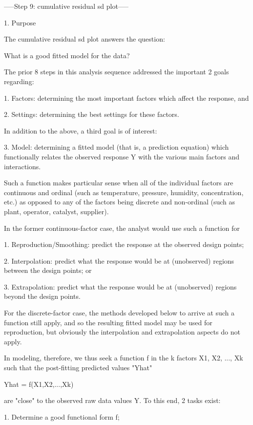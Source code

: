 -----Step 9: cumulative residual sd plot-----

1. Purpose

The cumulative residual sd plot answers the question:

   What is a good fitted model for the data?

The prior 8 steps in this analysis sequence
addressed the important 2 goals regarding:

   1. Factors: determining the most important factors
      which affect the response, and

   2. Settings: determining the best settings for these
      factors.

In addition to the above, a third goal is of
interest:

   3. Model: determining a fitted model (that is, a
      prediction equation) which functionally
      relates the observed response Y with the
      various main factors and interactions.

Such a function makes particular sense when all of the
individual factors are continuous and ordinal (such as
temperature, pressure, humidity, concentration, etc.)
as opposed to any of the factors being discrete and
non-ordinal (such as plant, operator, catalyst,
supplier).

In the former continuous-factor case, the analyst would
use such a function for

   1. Reproduction/Smoothing: predict the response
      at the observed design points;

   2. Interpolation: predict what the response would be
      at (unobserved) regions between the design
      points; or

   3. Extrapolation: predict what the response would be
      at (unobserved) regions beyond the design
      points.

For the discrete-factor case, the methods
developed below to arrive at such a function still
apply, and so the resulting fitted model may be
used for reproduction, but obviously the
interpolation and extrapolation aspects do not
apply.

In modeling, therefore, we thus seek a function f in
the k factors X1, X2, ..., Xk such that the
post-fitting predicted values "Yhat"

   Yhat = f(X1,X2,...,Xk)

are "close" to the observed raw data values Y. To
this end, 2 tasks exist:

   1. Determine a good functional form f;

